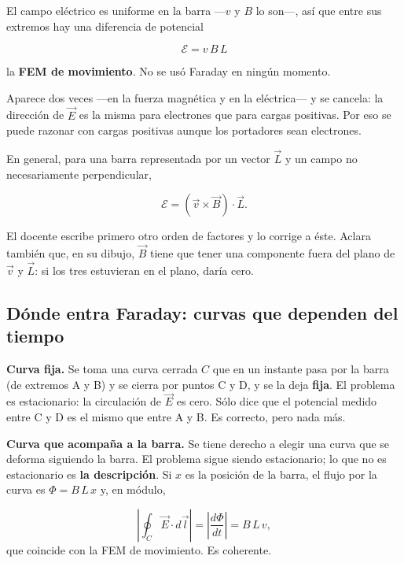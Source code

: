\documentclass[12pt,a4paper]{article}
\begin{document}
El campo eléctrico es uniforme en la barra ---$v$ y $B$ lo son---, así que entre
sus extremos hay una diferencia de potencial

\begin{keybox}
\[
\boxed{\ \mathcal{E} = v\,B\,L\ }
\]
\end{keybox}
la \textbf{FEM de movimiento}. No se usó Faraday en ningún momento.

\begin{notebox}
Aparece dos veces ---en la fuerza magnética
y en la eléctrica--- y se cancela: la dirección de $\vec E$ es la misma para
electrones que para cargas positivas. Por eso se puede razonar con cargas
positivas aunque los portadores sean electrones.
\end{notebox}

En general, para una barra representada por un vector $\vec L$ y un campo no
necesariamente perpendicular,

\[
\mathcal{E} = (\vec v\times\vec B)\cdot\vec L .
\]

\begin{notebox}
El docente escribe primero otro orden de factores y lo corrige a éste. Aclara
también que, en su dibujo, $\vec B$ tiene que tener una componente fuera del
plano de $\vec v$ y $\vec L$: si los tres estuvieran en el plano, daría cero.
\end{notebox}

\subsection{Dónde entra Faraday: curvas que dependen del tiempo}

\textbf{Curva fija.} Se toma una curva cerrada $C$ que en un instante pasa por la
barra (de extremos A y B) y se cierra por puntos C y D, y se la deja \textbf{fija}.
El problema es estacionario: la circulación de $\vec E$ es cero. Sólo dice que
el potencial medido entre C y D es el mismo que entre A y B. Es correcto, pero
nada más.

\textbf{Curva que acompaña a la barra.} Se tiene derecho a elegir una curva que se
deforma siguiendo la barra. El problema sigue siendo estacionario; lo que no es
estacionario es \textbf{la descripción}. Si $x$ es la posición de la barra, el flujo
por la curva es $\Phi = B\,L\,x$ y, en módulo,

\[
\left|\oint_C \vec E\cdot d\vec l\right| = \left|\frac{d\Phi}{dt}\right| = B\,L\,v,
\]
que coincide con la FEM de movimiento. Es coherente.
\end{document}
